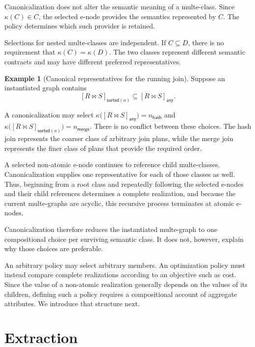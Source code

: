 \documentclass[sigconf,nonacm]{acmart}
\theoremstyle{definition}
\newtheorem{example}[definition]{Example}
\theoremstyle{plain}
\theoremstyle{remark}
\begin{document}
Canonicalization does not alter the semantic meaning of a
multe-class.  Since \(\kappa(C)\in C\),
the selected e-node provides the semantics represented by \(C\).
The policy determines which such provider is retained.

Selections for nested multe-classes are independent.  If
\(C\subseteq D\), there is no requirement that
\(\kappa(C)=\kappa(D)\).
The two classes represent different semantic contracts and may have
different preferred representatives.

\begin{example}[Canonical representatives for the running join]
Suppose an instantiated graph contains
\[
[R\Join S]_{\mathsf{sorted}(a)}
\subseteq
[R\Join S]_{\mathsf{any}}.
\]

A canonicalization may select
\(\kappa\bigl([R\Join S]_{\mathsf{any}}\bigr) = n_{\mathsf{hash}}\)
and
\(\kappa\bigl([R\Join S]_{\mathsf{sorted}(a)}\bigr) =
n_{\mathsf{merge}}\).
There is no conflict between these choices.
The hash join represents the coarser class of arbitrary join plans,
while the merge join represents the finer class of plans that provide
the required order.
\end{example}

A selected non-atomic e-node continues to reference child
multe-classes.  Canonicalization supplies one representative for each
of those classes as well.  Thus, beginning from a root class and
repeatedly following the selected e-nodes and their child references
determines a complete realization, and because the current
multe-graphs are acyclic, this recursive process terminates at atomic
e-nodes.

Canonicalization therefore reduces the instantiated multe-graph to one
compositional choice per surviving semantic class.  It does not,
however, explain why those choices are preferable.

An arbitrary policy may select arbitrary members.  An optimization
policy must instead compare complete realizations according to an
objective such as cost.  Since the value of a non-atomic realization
generally depends on the values of its children, defining such a policy
requires a compositional account of aggregate attributes.  We introduce
that structure next.

\section{Extraction}
\label{sec:extraction}
\end{document}
